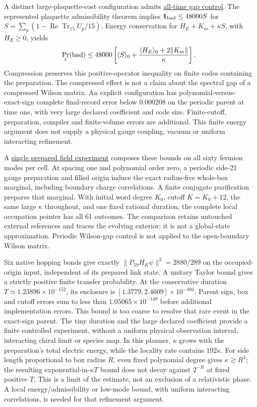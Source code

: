 A distinct large-plaquette-cost configuration admits
\href{https://github.com/FloatingPragma/observer-patch-holography/blob/main/model/particle_field_preparation/REFINEMENT.md}{all-time gap control}.
The represented plaquette admissibility theorem implies
$\mathbf1_{\rm bad}\le48000S$ for
$S=\sum_p(1-\operatorname{Re}\operatorname{Tr}_{15}U_p/15)$.
Energy conservation for $H_E+K_m+\kappa S$, with $H_E\ge0$, yields
\[
 \Pr_t({\rm bad})\le48000\left[
 \langle S\rangle_0+
 \frac{\langle H_E\rangle_0+2\|K_m\|}{\kappa}\right].
\]
Compression preserves this positive-operator inequality on finite codes
containing the preparation. The compressed effect is not a claim about
the spectral gap of a compressed Wilson matrix. An explicit configuration
has polynomial-versus-exact-sign complete final-record error below
$0.000208$ on the periodic parent at time one, with very large declared
coefficient and code size. Finite-cutoff, preparation, compiler and
finite-volume errors are additional.
This finite energy argument does not supply a physical gauge coupling,
vacuum or uniform interacting refinement.

A \href{https://github.com/FloatingPragma/observer-patch-holography/blob/main/model/particle_prepared_field_readout/PROOF.md}{single prepared field experiment}
composes these bounds on all sixty fermion modes per cell. At spacing
one and polynomial order zero, a periodic side-21 gauge preparation and
filled origin induce the exact radius-five whole-box marginal, including
boundary charge correlations. A finite conjugate purification prepares
that marginal. With initial word degree $K_0$, cutoff $K=K_0+12$,
the same large $\kappa$ throughout, and one fixed rational duration,
the complete local occupation pointer has all 61 outcomes. The comparison
retains untouched external references and traces the evolving exterior;
it is not a global-state approximation. Periodic Wilson-gap control is
not applied to the open-boundary Wilson matrix.

Six native hopping bonds give exactly
$\|P_{59}H_K\psi\|^2=2880/289$ on the occupied-origin input,
independent of its prepared link state. A unitary Taylor bound gives a
strictly positive finite transfer probability. At the conservative
duration $T\simeq1.23896\times10^{-152}$, its enclosure is
$[1.3779,2.4609]\times10^{-303}$. Parent sign, box and cutoff errors
sum to less than $1.05065\times10^{-149}$ before additional
implementation errors. This bound is too coarse to resolve that rare
event in the exact-sign parent. The tiny duration and the large declared
coefficient provide a finite controlled experiment, without a uniform
physical observation interval, interacting chiral limit or species map.
In this planner, $\kappa$ grows with the preparation's total electric
energy, while the locality rate contains $192\kappa$. For side length
proportional to box radius $R$, even fixed polynomial degree gives
$\kappa\gtrsim R^3$; the resulting exponential-in-$\kappa T$ bound
does not decay against $2^{-R}$ at fixed positive $T$. This is a limit
of the estimate, not an exclusion of a relativistic phase. A local
energy/admissibility or low-mode bound, with uniform interacting
correlations, is needed for that refinement argument.

